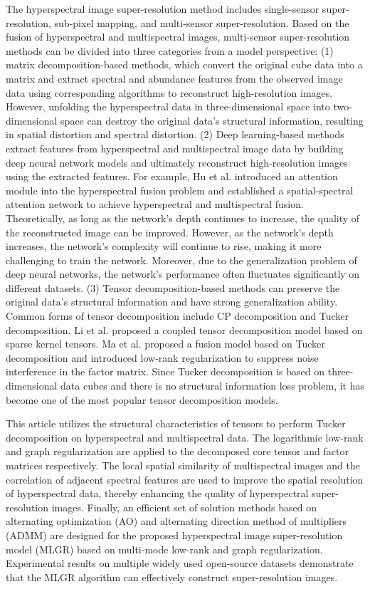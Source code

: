 \documentclass[journal]{IEEEtran}%
\begin{document}
The hyperspectral image super{-}resolution method includes single{-}sensor super{-}resolution, sub{-}pixel mapping, and multi{-}sensor super{-}resolution. Based on the fusion of hyperspectral and multispectral images, multi{-}sensor super{-}resolution methods can be divided into three categories from a model perspective: (1) matrix decomposition{-}based methods, which convert the original cube data into a matrix and extract spectral and abundance features from the observed image data using corresponding algorithms to reconstruct high{-}resolution images. However, unfolding the hyperspectral data in three{-}dimensional space into two{-}dimensional space can destroy the original data's structural information, resulting in spatial distortion and spectral distortion. (2) Deep learning{-}based methods extract features from hyperspectral and multispectral image data by building deep neural network models and ultimately reconstruct high{-}resolution images using the extracted features. For example, Hu et al. introduced an attention module into the hyperspectral fusion problem and established a spatial{-}spectral attention network to achieve hyperspectral and multispectral fusion. Theoretically, as long as the network's depth continues to increase, the quality of the reconstructed image can be improved. However, as the network's depth increases, the network's complexity will continue to rise, making it more challenging to train the network. Moreover, due to the generalization problem of deep neural networks, the network's performance often fluctuates significantly on different datasets. (3) Tensor decomposition{-}based methods can preserve the original data's structural information and have strong generalization ability. Common forms of tensor decomposition include CP decomposition and Tucker decomposition. Li et al. proposed a coupled tensor decomposition model based on sparse kernel tensors. Ma et al. proposed a fusion model based on Tucker decomposition and introduced low{-}rank regularization to suppress noise interference in the factor matrix. Since Tucker decomposition is based on three{-}dimensional data cubes and there is no structural information loss problem, it has become one of the most popular tensor decomposition models.%
\par%
This article utilizes the structural characteristics of tensors to perform Tucker decomposition on hyperspectral and multispectral data. The logarithmic low{-}rank and graph regularization are applied to the decomposed core tensor and factor matrices respectively. The local spatial similarity of multispectral images and the correlation of adjacent spectral features are used to improve the spatial resolution of hyperspectral data, thereby enhancing the quality of hyperspectral super{-}resolution images. Finally, an efficient set of solution methods based on alternating optimization (AO) and alternating direction method of multipliers (ADMM) are designed for the proposed hyperspectral image super{-}resolution model (MLGR) based on multi{-}mode low{-}rank and graph regularization. Experimental results on multiple widely used open{-}source datasets demonstrate that the MLGR algorithm can effectively construct super{-}resolution images.%
\par

%
\end{document}
